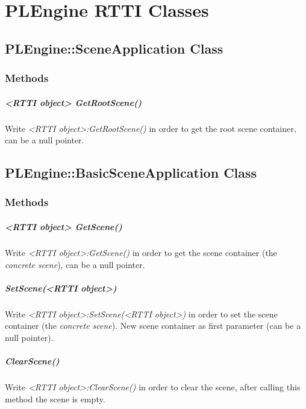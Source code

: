 \chapter{PLEngine RTTI Classes}




\section{PLEngine::SceneApplication Class}


\subsection{Methods}

\paragraph{<RTTI object> GetRootScene()}
Write \emph{<RTTI object>:GetRootScene()} in order to get the root scene container, can be a null pointer.




\section{PLEngine::BasicSceneApplication Class}


\subsection{Methods}

\paragraph{<RTTI object> GetScene()}
Write \emph{<RTTI object>:GetScene()} in order to get the scene container (the \emph{concrete scene}), can be a null pointer.

\paragraph{SetScene(<RTTI object>)}
Write \emph{<RTTI object>:SetScene(<RTTI object>)} in order to set the scene container (the \emph{concrete scene}). New scene container as first parameter (can be a null pointer).

\paragraph{ClearScene()}
Write \emph{<RTTI object>:ClearScene()} in order to clear the scene, after calling this method the scene is empty.

